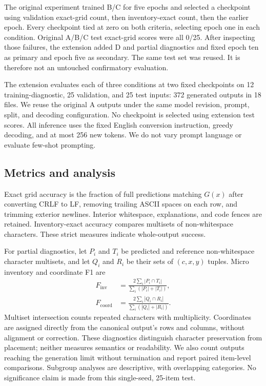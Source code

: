 \documentclass[journal]{IEEEtran}
\begin{document}
The original experiment trained B/C for five epochs and selected a checkpoint using validation exact-grid count, then inventory-exact count, then the earlier epoch. Every checkpoint tied at zero on both criteria, selecting epoch one in each condition. Original A/B/C test exact-grid scores were all 0/25. After inspecting those failures, the extension added D and partial diagnostics and fixed epoch ten as primary and epoch five as secondary. The same test set was reused. It is therefore not an untouched confirmatory evaluation.

The extension evaluates each of three conditions at two fixed checkpoints on 12 training-diagnostic, 25 validation, and 25 test inputs: 372 generated outputs in 18 files. We reuse the original A outputs under the same model revision, prompt, split, and decoding configuration. No checkpoint is selected using extension test scores. All inference uses the fixed English conversion instruction, greedy decoding, and at most 256 new tokens. We do not vary prompt language or evaluate few-shot prompting.

\subsection{Metrics and analysis}
Exact grid accuracy is the fraction of full predictions matching $G(x)$ after converting CRLF to LF, removing trailing ASCII spaces on each row, and trimming exterior newlines. Interior whitespace, explanations, and code fences are retained. Inventory-exact accuracy compares multisets of non-whitespace characters. These strict measures indicate whole-output success.

For partial diagnostics, let $P_i$ and $T_i$ be predicted and reference non-whitespace character multisets, and let $Q_i$ and $R_i$ be their sets of $(c,x,y)$ tuples. Micro inventory and coordinate F1 are
\begin{align}
F_{\mathrm{inv}}&=\frac{2\sum_i|P_i\cap T_i|}{\sum_i(|P_i|+|T_i|)},\\
F_{\mathrm{coord}}&=\frac{2\sum_i|Q_i\cap R_i|}{\sum_i(|Q_i|+|R_i|)}.
\end{align}
Multiset intersection counts repeated characters with multiplicity. Coordinates are assigned directly from the canonical output's rows and columns, without alignment or correction. These diagnostics distinguish character preservation from placement; neither measures semantics or readability. We also count outputs reaching the generation limit without termination and report paired item-level comparisons. Subgroup analyses are descriptive, with overlapping categories. No significance claim is made from this single-seed, 25-item test.
\end{document}
